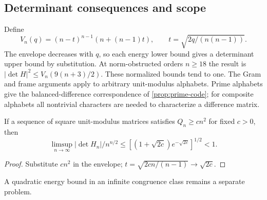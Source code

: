 \subsection{Determinant consequences and scope}
Define
\[V_n(q)=(n-t)^{n-1}(n+(n-1)t),\qquad t=\sqrt{2q/(n(n-1))}.\]
The envelope decreases with $q$, so each energy lower bound gives a determinant upper bound by substitution. At norm-obstructed orders $n\ge18$ the result is $|\det H|^2\le V_n(9(n+3)/2)$. These normalized bounds tend to one.
The Gram and frame arguments apply to arbitrary unit-modulus alphabets. Prime alphabets give the balanced-difference correspondence of \cref{prop:prime-code}; for composite alphabets all nontrivial characters are needed to characterize a difference matrix.
\begin{corollary}\label{cor:gap}
If a sequence of square unit-modulus matrices satisfies $Q_n\ge cn^2$ for fixed $c>0$, then
\[\limsup_{n\to\infty}|\det H_n|/n^{n/2}\le[(1+\sqrt{2c})e^{-\sqrt{2c}}]^{1/2}<1.\]
\end{corollary}
\begin{proof}
Substitute $cn^2$ in the envelope; $t=\sqrt{2cn/(n-1)}\to\sqrt{2c}$.
\end{proof}
A quadratic energy bound in an infinite congruence class remains a separate problem.
